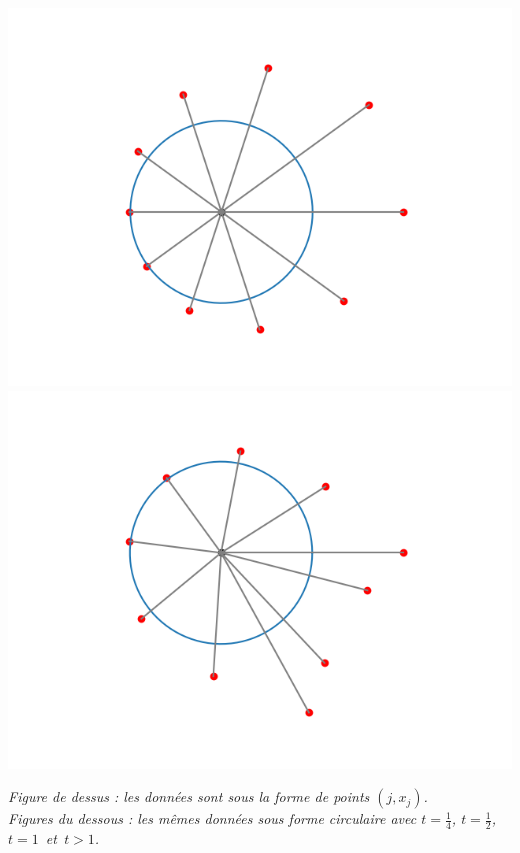 \documentclass[11pt,class=report,crop=false]{standalone}
\begin{document}
\begin{center}
\includegraphics[scale=\myscale,scale=0.4]{figures/fourier-3d}
\includegraphics[scale=\myscale,scale=0.4]{figures/fourier-3e}

\nopagebreak

\begin{minipage}{0.8\textwidth}
\center\emph{
Figure de dessus : les données sont sous la forme de points $(j,x_j)$.\\
Figures du dessous : les mêmes données sous forme circulaire avec $t=\frac14$, $t=\frac12$, $t=1$~et~$t>1$.}
\end{minipage}

\end{center}


\end{document}
